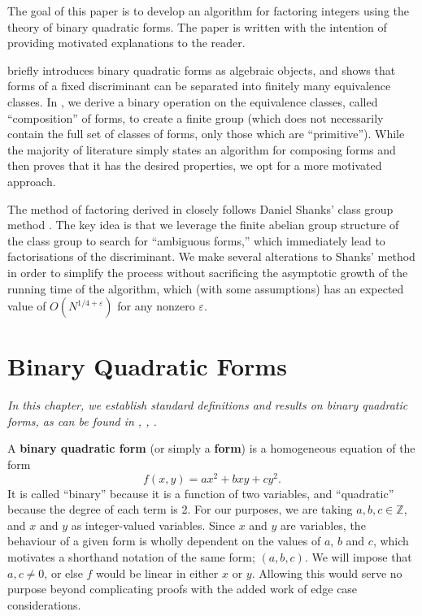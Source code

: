 \documentclass[honours,12pt]{unswthesis}
\newcommand{\Z}{\mathbb{Z}} %
\numberwithin{equation}{section}
\begin{document}
The goal of this paper is to develop an algorithm for factoring integers using the theory of binary quadratic forms.
The paper is written with the intention of providing motivated explanations to the reader. 

 briefly introduces binary quadratic forms as algebraic objects, and shows that forms of a fixed discriminant can be separated into finitely many equivalence classes.
In , we derive a binary operation on the equivalence classes, called ``composition'' of forms, to create a finite group (which does not necessarily contain the full set of classes of forms, only those which are ``primitive'').
While the majority of literature simply states an algorithm for composing forms and then proves that it has the desired properties, we opt for a more motivated approach.

The method of factoring derived in  closely follows Daniel Shanks' class group method \cite{shanks}.
The key idea is that we leverage the finite abelian group structure of the class group to search for ``ambiguous forms,'' which immediately lead to factorisations of the discriminant.
We make several alterations to Shanks' method in order to simplify the process without sacrificing the asymptotic growth of the running time of the algorithm, which (with some assumptions) has an expected value of $O(N^{1/4 + \varepsilon})$ for any nonzero $\varepsilon$.




\pagebreak
\chapter{Binary Quadratic Forms}\label{s-forms}

\hspace{-3.5mm}
\textit{
    In this chapter, we establish standard definitions and results on binary quadratic forms,
    as can be found in \cite[Ch.\,1,\,2,\,5]{buchmann}, \cite[Ch.\,1-2]{buell}, \cite[\S\,2]{cox}.
}

\vspace{2mm}
\noindent
A \textbf{binary quadratic form} (or simply a \textbf{form}) is a homogeneous equation of the form
$$f(x, y) = ax^2 + bxy + cy^2.$$
It is called ``binary'' because it is a function of two variables, and ``quadratic'' because the degree of each term is 2.
For our purposes, we are taking $a, b, c \in \Z$, and $x$ and $y$ as integer-valued variables.
Since $x$ and $y$ are variables, the behaviour of a given form is wholly dependent on the values of $a$, $b$ and $c$,
which motivates a shorthand notation of the same form; $(a, b, c)$.
We will impose that $a, c \neq 0$, or else $f$ would be linear in either $x$ or $y$.
Allowing this would serve no purpose beyond complicating proofs with the added work of edge case considerations.
\end{document}
